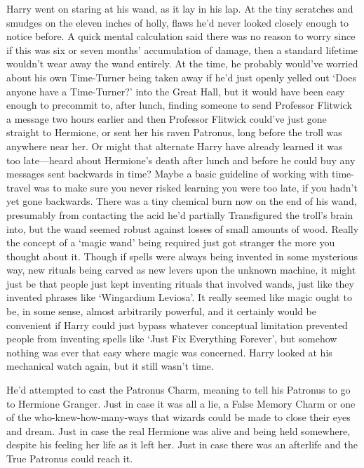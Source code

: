 Harry went on staring at his wand, as it lay in his lap. At the tiny scratches 
and smudges on the eleven inches of holly, flaws he'd never looked closely 
enough to notice before. A quick mental calculation said there was no reason to 
worry since if this was six or seven months' accumulation of damage, then a 
standard lifetime wouldn't wear away the wand entirely. At the time, he 
probably would've worried about his own Time-Turner being taken away if he'd 
just openly yelled out `Does anyone have a Time-Turner?' into the Great Hall, 
but it would have been easy enough to precommit to, after lunch, finding 
someone to send Professor Flitwick a message two hours earlier and then 
Professor Flitwick could've just gone straight to Hermione, or sent her his 
raven Patronus, long before the troll was anywhere near her. Or might that 
alternate Harry have already learned it was too late---heard about Hermione's 
death after lunch and before he could buy any messages sent backwards in time? 
Maybe a basic guideline of working with time-travel was to make sure you never 
risked learning you were too late, if you hadn't yet gone backwards. There was 
a tiny chemical burn now on the end of his wand, presumably from contacting the 
acid he'd partially Transfigured the troll's brain into, but the wand seemed 
robust against losses of small amounts of wood. Really the concept of a `magic 
wand' being required just got stranger the more you thought about it. Though if 
spells were always being invented in some mysterious way, new rituals being 
carved as new levers upon the unknown machine, it might just be that people 
just kept inventing rituals that involved wands, just like they invented 
phrases like `Wingardium Leviosa'. It really seemed like magic ought to be, in 
some sense, almost arbitrarily powerful, and it certainly would be convenient 
if Harry could just bypass whatever conceptual limitation prevented people from 
inventing spells like `Just Fix Everything Forever', but somehow nothing was 
ever that easy where magic was concerned. Harry looked at his mechanical watch 
again, but it still wasn't time.

He'd attempted to cast the Patronus Charm, meaning to tell his Patronus to go 
to Hermione Granger. Just in case it was all a lie, a False Memory Charm or one 
of the who-knew-how-many-ways that wizards could be made to close their eyes 
and dream. Just in case the real Hermione was alive and being held somewhere, 
despite his feeling her life as it left her. Just in case there was an 
afterlife and the True Patronus could reach it.

